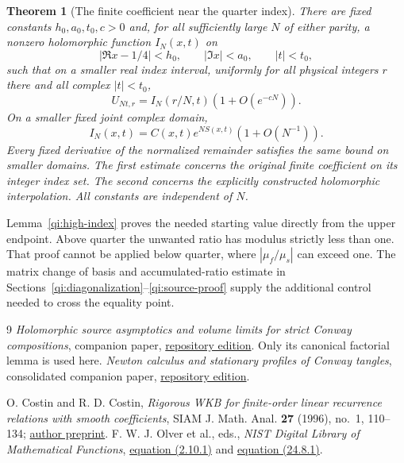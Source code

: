 \documentclass[11pt]{article}
\numberwithin{equation}{section}
\newtheorem{theorem}{Theorem}[section]
\theoremstyle{remark}\newtheorem{remark}[theorem]{Remark}
\begin{document}
\begin{theorem}[The finite coefficient near the quarter index]\label{qi:main}
There are fixed constants $h_0,a_0,t_0,c>0$ and, for all sufficiently large $N$ of either parity, a nonzero holomorphic function $I_N(x,t)$ on
\[
 |\Re x-1/4|<h_0,\qquad |\Im x|<a_0,\qquad |t|<t_0,
\]
such that on a smaller real index interval, uniformly for all physical integers $r$ there and all complex $|t|<t_0$,
\begin{equation}\label{qi:grid}
 U_{Nt,r}=I_N(r/N,t)(1+O(e^{-cN})).
\end{equation}
On a smaller fixed joint complex domain,
\begin{equation}\label{qi:complex}
 I_N(x,t)=C(x,t)e^{NS(x,t)}(1+O(N^{-1})).
\end{equation}
Every fixed derivative of the normalized remainder satisfies the same bound on smaller domains. The first estimate concerns the original finite coefficient on its integer index set. The second concerns the explicitly constructed holomorphic interpolation. All constants are independent of $N$.
\end{theorem}

Lemma~\ref{qi:high-index} proves the needed starting value directly
from the upper endpoint. Above quarter the unwanted ratio has modulus
strictly less than one. That proof cannot be applied below quarter,
where $|\mu_f/\mu_s|$ can exceed one. The matrix change of basis and
accumulated-ratio estimate in
Sections~\ref{qi:diagonalization}--\ref{qi:source-proof} supply the
additional control needed to cross the equality point.






\begin{thebibliography}{9}
\emph{Holomorphic source asymptotics and volume limits
for strict Conway compositions}, companion paper,
\href{https://sashakolpakov.github.io/murakamis_dream/papers/conway-asymptotics.pdf}{repository edition}.
Only its canonical factorial lemma is used here.
\emph{Newton calculus and stationary profiles of Conway tangles},
consolidated companion paper,
\href{https://sashakolpakov.github.io/murakamis_dream/papers/newton-calculus.pdf}{repository edition}.

 O. Costin and R. D. Costin,
\emph{Rigorous WKB for finite-order linear recurrence relations with smooth coefficients},
SIAM J. Math. Anal. \textbf{27} (1996), no.~1, 110--134;
\href{https://arxiv.org/abs/math/0608413}{author preprint}.
 F. W. J. Olver et al., eds.,
\emph{NIST Digital Library of Mathematical Functions},
\href{https://dlmf.nist.gov/2.10.E1}{equation (2.10.1)} and
\href{https://dlmf.nist.gov/24.8.E1}{equation (24.8.1)}.
\end{thebibliography}
\end{document}
